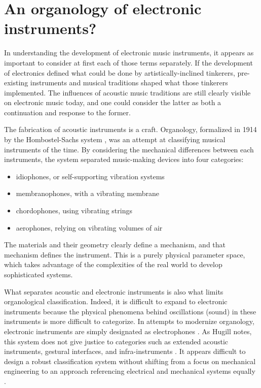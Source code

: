 \section{An organology of electronic instruments?}  

In understanding the development of electronic music instruments, it appears as important to consider at first each of those terms separately. If the development of electronics defined what could be done by artistically-inclined tinkerers, pre-existing instruments and musical traditions shaped what those tinkerers implemented. The influences of acoustic music traditions are still clearly visible on electronic music today, and one could consider the latter as both a continuation and response to the former. 

The fabrication of acoustic instruments is a craft. Organology, formalized in 1914 by the Hombostel-Sachs system \cite{von1961}, was an attempt at classifying musical instruments of the time. By considering the mechanical differences between each instruments, the system separated music-making devices into four categories: 

\begin{itemize}
	\item idiophones, or self-supporting vibration systems
	\item membranophones, with a vibrating membrane
	\item chordophones, using vibrating strings
	\item aerophones, relying on vibrating volumes of air
\end{itemize}

The materials and their geometry clearly define a mechanism, and that mechanism defines the instrument. This is a purely physical parameter space, which takes advantage of the complexities of the real world to develop sophisticated systems. 

What separates acoustic and electronic instruments is also what limits organological classification. Indeed, it is difficult to expand to electronic instruments because the physical phenomena behind oscillations (sound) in these instruments is more difficult to categorize. In attempts to modernize organology, electronic instruments are simply designated as electrophones \cite{hugill2012}. As Hugill notes, this system does not give justice to categories such as extended acoustic instruments, gestural interfaces, and infra-instruments \cite{bowers2005}. It appears difficult to design a robust classification system without shifting from a focus on mechanical engineering to an approach referencing electrical and mechanical systems equally \cite{haslett2005}. 

